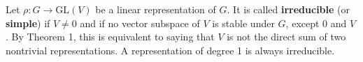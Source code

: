 Let $\rho: G \to \text{GL}(V)$ be a linear representation of $G$. It is called \textbf{irreducible} (or \textbf{simple}) if $V \neq 0$ and if no vector subspace of $V$ is stable under $G$, except $0$ and $V$. By Theorem 1, this is equivalent to saying that $V$ is not the direct sum of two nontrivial representations. A representation of degree 1 is always irreducible.
